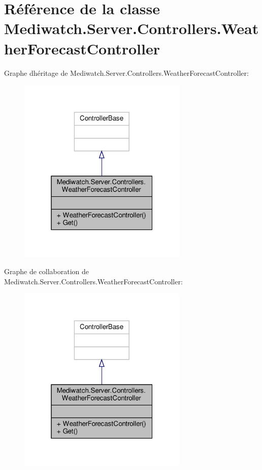 \hypertarget{class_mediwatch_1_1_server_1_1_controllers_1_1_weather_forecast_controller}{}\section{Référence de la classe Mediwatch.\+Server.\+Controllers.\+Weather\+Forecast\+Controller}
\label{class_mediwatch_1_1_server_1_1_controllers_1_1_weather_forecast_controller}


Graphe d\textquotesingle{}héritage de Mediwatch.\+Server.\+Controllers.\+Weather\+Forecast\+Controller\+:\nopagebreak
\begin{figure}[H]
\begin{center}
\leavevmode
\includegraphics[width=229pt]{class_mediwatch_1_1_server_1_1_controllers_1_1_weather_forecast_controller__inherit__graph}
\end{center}
\end{figure}


Graphe de collaboration de Mediwatch.\+Server.\+Controllers.\+Weather\+Forecast\+Controller\+:\nopagebreak
\begin{figure}[H]
\begin{center}
\leavevmode
\includegraphics[width=229pt]{class_mediwatch_1_1_server_1_1_controllers_1_1_weather_forecast_controller__coll__graph}
\end{center}
\end{figure}

